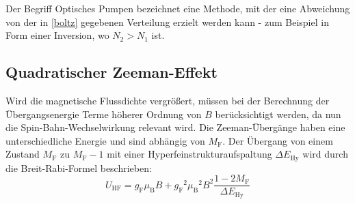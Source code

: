 Der Begriff Optisches Pumpen bezeichnet eine Methode, mit der eine Abweichung von der in \autoref{boltz} gegebenen
Verteilung erzielt werden kann - zum Beispiel in Form einer Inversion, wo $N_2 > N_1$ ist.

\subsection{Quadratischer Zeeman-Effekt}

Wird die magnetische Flussdichte vergrößert, müssen bei der Berechnung der Übergangsenergie Terme höherer Ordnung von $B$
berücksichtigt werden, da nun die Spin-Bahn-Wechselwirkung relevant wird. Die Zeeman-Übergänge haben eine unterschiedliche
Energie und sind abhängig von $M_\text{F}$. Der Übergang von einem Zustand $M_\text{F}$ zu $M_\text{F}-1$ mit einer
Hyperfeinstrukturaufspaltung $\Delta E_\text{Hy}$ wird durch die Breit-Rabi-Formel beschrieben:
\begin{equation}
  U_\text{HF} = g_\text{F}\mu_\text{B}B + {g_\text{F}}^2{\mu_\text{B}}^2B^2\frac{1-2M_\text{F}}{\Delta E_\text{Hy}}
\end{equation}
